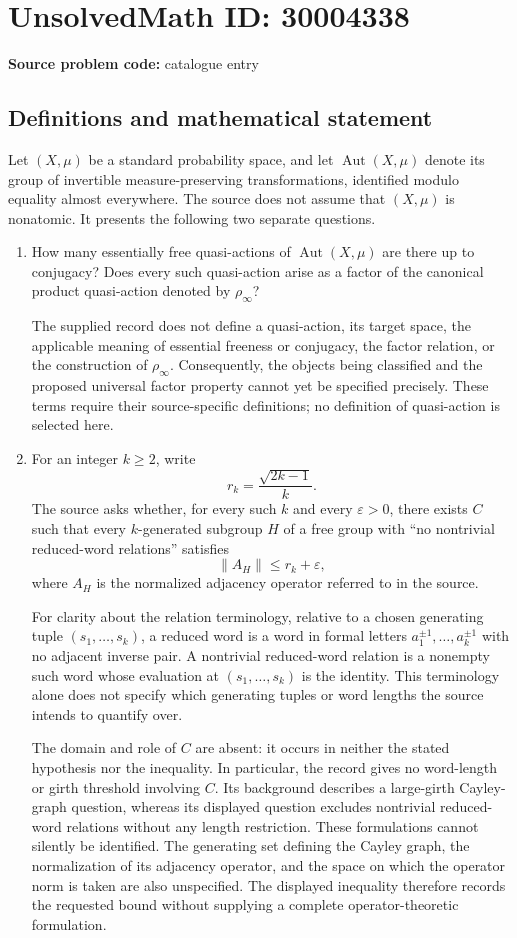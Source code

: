 \documentclass[11pt]{article}
\begin{document}
\section*{UnsolvedMath ID: 30004338}
\textbf{Source problem code:} catalogue entry
\subsection{Definitions and mathematical statement}
Let \((X,\mu)\) be a standard probability space, and let \(\operatorname{Aut}(X,\mu)\) denote its group of invertible measure-preserving transformations, identified modulo equality almost everywhere. The source does not assume that \((X,\mu)\) is nonatomic. It presents the following two separate questions.

\begin{enumerate}
\item How many essentially free quasi-actions of \(\operatorname{Aut}(X,\mu)\) are there up to conjugacy? Does every such quasi-action arise as a factor of the canonical product quasi-action denoted by \(\rho_\infty\)?

The supplied record does not define a quasi-action, its target space, the applicable meaning of essential freeness or conjugacy, the factor relation, or the construction of \(\rho_\infty\). Consequently, the objects being classified and the proposed universal factor property cannot yet be specified precisely. These terms require their source-specific definitions; no definition of quasi-action is selected here.

\item For an integer \(k\geq 2\), write
\[
 r_k=\frac{\sqrt{2k-1}}{k}.
\]
The source asks whether, for every such \(k\) and every \(\varepsilon>0\), there exists \(C\) such that every \(k\)-generated subgroup \(H\) of a free group with ``no nontrivial reduced-word relations'' satisfies
\[
 \lVert A_H\rVert\leq r_k+\varepsilon,
\]
where \(A_H\) is the normalized adjacency operator referred to in the source.

For clarity about the relation terminology, relative to a chosen generating tuple \((s_1,\ldots,s_k)\), a reduced word is a word in formal letters \(a_1^{\pm1},\ldots,a_k^{\pm1}\) with no adjacent inverse pair. A nontrivial reduced-word relation is a nonempty such word whose evaluation at \((s_1,\ldots,s_k)\) is the identity. This terminology alone does not specify which generating tuples or word lengths the source intends to quantify over.

The domain and role of \(C\) are absent: it occurs in neither the stated hypothesis nor the inequality. In particular, the record gives no word-length or girth threshold involving \(C\). Its background describes a large-girth Cayley-graph question, whereas its displayed question excludes nontrivial reduced-word relations without any length restriction. These formulations cannot silently be identified. The generating set defining the Cayley graph, the normalization of its adjacency operator, and the space on which the operator norm is taken are also unspecified. The displayed inequality therefore records the requested bound without supplying a complete operator-theoretic formulation.
\end{enumerate}
\end{document}
